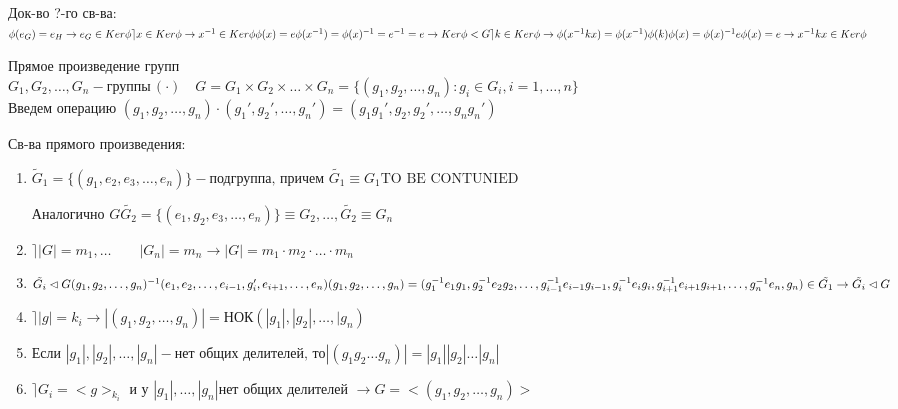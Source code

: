 \documentclass[12pt]{article}
\begin{document}
	Док-во ?-го св-ва:$\phi(e_G)=e_H\rightarrow e_G \in Ker\phi\\
	\rceil x\in Ker\phi \rightarrow x^{-1}\in Ker\phi\\
	\phi(x)=e\\
	\phi(x^{-1})=\phi(x)^{-1}=e^{-1}=e \rightarrow Ker\phi <G \\
	\rceil k\in Ker\phi \rightarrow \phi(x^{-1}kx)=\phi(x^{-1})\phi(k)\phi(x)=\phi(x)^{-1}e\phi(x)=e \rightarrow \\
	x^{-1}kx \in Ker\phi $

	\begin{Def}
		Прямое произведение групп \\
		$G_1, G_2, \dots , G_n - \text{группы} \, (\cdot) \quad G=G_1\times G_2 \times \dots \times G_n=\{ (g_1,g_2, \dots , g_n):g_i\in G_i, i=1, \dots , n  \}$ \\
		Введем операцию $(g_1,g_2, \dots , g_n) \cdot (g_1',g_2', \dots , g_n')=(g_1 g_1', g_2, g_2', \dots, g_n g_n') $
	\end{Def}
	\begin{Th}[G-группа]
	\end{Th}

	Св-ва прямого произведения:\begin{enumerate}
		\item $\tilde{G}_1 =\{ (g_1, e_2, e_3, \dots , e_n) \} -\text{подгруппа, причем } \tilde{G_1}\equiv G_1 \text{TO BE CONTUNIED}$
		
		Аналогично $G\tilde{G_2}=\{ (e_1,g_2,e_3, \dots , e_n) \} \equiv G_2, \dots , \tilde{G_2}\equiv G_n$
		
		\item $\rceil |G|=m_1, \dots \qquad |G_n|=m_n \rightarrow |G|=m_1 \cdot m_2 \cdot \dots \cdot m_n$ 
		
		\item $ \tilde{G_i} \lhd G \\
		(g_1, g_2, \dots , g_n)^{-1} (e_1, e_2, \dots, e_{i-1}, g_i', e_{i+1}, \dots, e_n )(g_1, g_2, \dots ,g_n)= \\
		(g_1^{-1} e_1 g_1, g_2^{-1} e_2 g_2, \dots , g_{i-1}^{-1} e_{i-1} g_{i-1}, g_i^{-1}e_i g_i,  g_{i+1}^{-1}e_{i+1} g_{i+1}, \dots , g_n^{-1}e_n, g_n  )\\
		\in \tilde{G_1}\rightarrow \tilde{G_i} \lhd G $
		
		\item $\rceil |g|=k_i \rightarrow |(g_1,g_2,\dots , g_n )|=\text{НОК}(|g_1|, |g_2|, \dots , |g_n)  $
		
		\item $\text{Если } |g_1|,|g_2|, \dots, |g_n|-\text{нет общих делителей, то} |(g_1g_2 \dots g_n)|=|g_1||g_2|\dots |g_n|  $
		
		\item $\rceil G_i=<g>_{k_i} \text{ и у } |g_1|, \dots , |g_n| \text{нет общих делителей }\rightarrow G=< (g_1, g_2, \dots, g_n) > $
		
		
	\end{enumerate}
	
\end{document}
